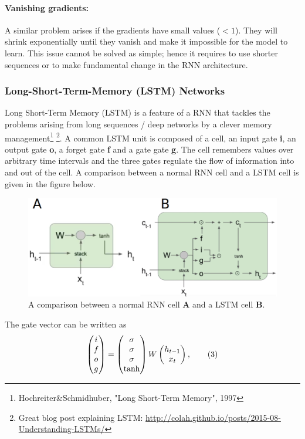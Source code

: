 \documentclass[main]{subfiles}
\begin{document}
\paragraph{Vanishing gradients:} A similar problem arises if the gradients have small values ($<1$). They will shrink exponentially until they vanish and make it impossible for the model to learn. This issue cannot be solved as simple; hence it requires to use shorter sequences or to make fundamental change in the RNN architecture. 


\subsubsection{Long-Short-Term-Memory (LSTM) Networks}
Long Short-Term Memory (LSTM) is a feature of a RNN that tackles the problems arising from long sequences / deep networks by a clever memory management\footnote{Hochreiter\&Schmidhuber, "Long Short-Term Memory", 1997} \footnote{Great blog post explaining LSTM: \url{http://colah.github.io/posts/2015-08-Understanding-LSTMs/}}. A common LSTM unit is composed of a cell, an input gate \textbf{i}, an output gate \textbf{o}, a forget gate \textbf{f} and a gate gate \textbf{g}. The cell remembers values over arbitrary time intervals and the three gates regulate the flow of information into and out of the cell. A comparison between a normal RNN cell and a LSTM cell is given in the figure below.  
\begin{figure}[H]
    \centering
    \includegraphics[width=0.99\linewidth]{13_LearningInRecurrentNeuronalNetworks/figures/lstm.png}
    \caption{A comparison between a normal RNN cell \textbf{A} and a LSTM cell \textbf{B}.}
    \label{fig:unroll}
\end{figure}
The gate vector can be written as 
\begin{equation*}
    \begin{pmatrix}i\\ f\\ o\\ g\end{pmatrix} = \begin{pmatrix}\sigma\\ \sigma\\ \sigma\\ \tanh\end{pmatrix} W \begin{pmatrix}h_{t-1}\\ x_t\end{pmatrix}, \tag{3}
\end{equation*}
\end{document}
